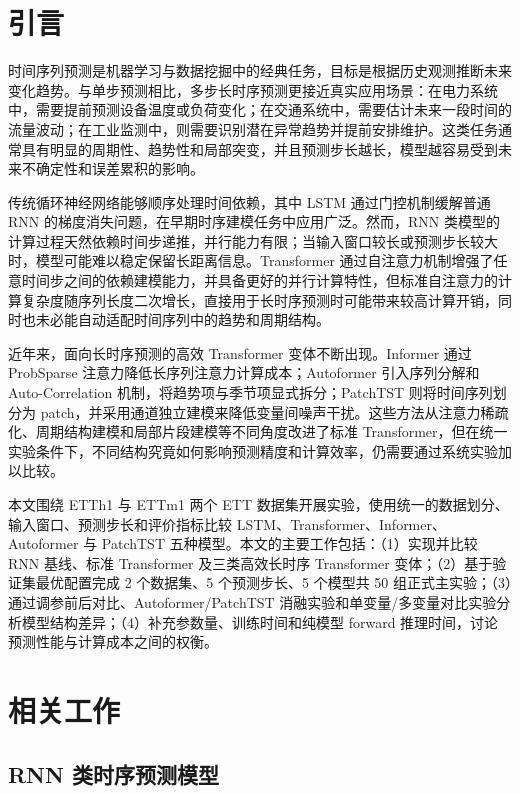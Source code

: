 \section{引言}\label{ux5f15ux8a00}

时间序列预测是机器学习与数据挖掘中的经典任务，目标是根据历史观测推断未来变化趋势。与单步预测相比，多步长时序预测更接近真实应用场景：在电力系统中，需要提前预测设备温度或负荷变化；在交通系统中，需要估计未来一段时间的流量波动；在工业监测中，则需要识别潜在异常趋势并提前安排维护。这类任务通常具有明显的周期性、趋势性和局部突变，并且预测步长越长，模型越容易受到未来不确定性和误差累积的影响。

传统循环神经网络能够顺序处理时间依赖，其中 LSTM 通过门控机制缓解普通 RNN 的梯度消失问题，在早期时序建模任务中应用广泛。然而，RNN 类模型的计算过程天然依赖时间步递推，并行能力有限；当输入窗口较长或预测步长较大时，模型可能难以稳定保留长距离信息。Transformer 通过自注意力机制增强了任意时间步之间的依赖建模能力，并具备更好的并行计算特性，但标准自注意力的计算复杂度随序列长度二次增长，直接用于长时序预测时可能带来较高计算开销，同时也未必能自动适配时间序列中的趋势和周期结构。

近年来，面向长时序预测的高效 Transformer 变体不断出现。Informer 通过 ProbSparse 注意力降低长序列注意力计算成本；Autoformer 引入序列分解和 Auto-Correlation 机制，将趋势项与季节项显式拆分；PatchTST 则将时间序列划分为 patch，并采用通道独立建模来降低变量间噪声干扰。这些方法从注意力稀疏化、周期结构建模和局部片段建模等不同角度改进了标准 Transformer，但在统一实验条件下，不同结构究竟如何影响预测精度和计算效率，仍需要通过系统实验加以比较。

本文围绕 ETTh1 与 ETTm1 两个 ETT 数据集开展实验，使用统一的数据划分、输入窗口、预测步长和评价指标比较 LSTM、Transformer、Informer、Autoformer 与 PatchTST 五种模型。本文的主要工作包括：（1）实现并比较 RNN 基线、标准 Transformer 及三类高效长时序 Transformer 变体；（2）基于验证集最优配置完成 2 个数据集、5 个预测步长、5 个模型共 50 组正式主实验；（3）通过调参前后对比、Autoformer/PatchTST 消融实验和单变量/多变量对比实验分析模型结构差异；（4）补充参数量、训练时间和纯模型 forward 推理时间，讨论预测性能与计算成本之间的权衡。

\section{相关工作}\label{ux76f8ux5173ux5de5ux4f5c}

\subsection{RNN 类时序预测模型}\label{rnn-ux7c7bux65f6ux5e8fux9884ux6d4bux6a21ux578b}


